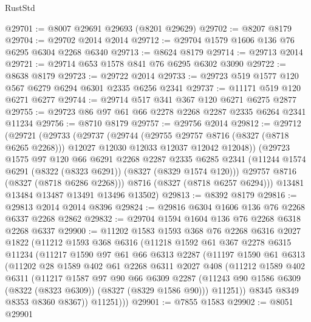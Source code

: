 \begin{lexlean}{RustStd}
\begin{coremodule}
@29701 := @8007 @29691 @29693 (@8201 @29629)
@29702 := @8207 @8179
@29704 := @29702 @2014 @2014
@29712 := @29704 @1579 @1606 @136 @76 @6295 @6304 @2268 @6340
@29713 := @8624 @8179
@29714 := @29713 @2014
@29721 := @29714 @653 @1578 @841 @76 @6295 @6302 @3090
@29722 := @8638 @8179
@29723 := @29722 @2014
@29733 := @29723 @519 @1577 @120 @567 @6279 @6294 @6301 @2335 @6256 @2341
@29737 := @11171 @519 @120 @6271 @6277
@29744 := @29714 @517 @341 @367 @120 @6271 @6275 @2877
@29755 := @29723 @86 @97 @61 @66 @2278 @2268 @2287 @2335 @6264 @2341 @11234
@29756 := @8710 @8179
@29757 := @29756 @2014
@29812 := @29712
    (@29721
      (@29733
        (@29737
          (@29744
            (@29755 @29757 @8716 (@8327 (@8718 @6265 @2268)))
            @12027
            @12030
            @12033
            @12037
            @12042
            @12048))
        (@29723
          @1575
          @97
          @120
          @66
          @6291
          @2268
          @2287
          @2335
          @6285
          @2341
          (@11244 @1574 @6291 (@8322 (@8323 @6291)) (@8327 (@8329 @1574 @120)))
          @29757
          @8716
          (@8327 (@8718 @6286 @2268)))
        @8716
        (@8327 (@8718 @6257 @6294)))
      @13481
      @13484
      @13487
      @13491
      @13496
      @13502)
@29813 := @8392 @8179
@29816 := @29813 @2014 @2014 @8396
@29824 := @29816 @6304 @1606 @136 @76 @2268 @6337 @2268 @2862
@29832 := @29704 @1594 @1604 @136 @76 @2268 @6318 @2268 @6337
@29900 := @11202
    @1583
    @1593
    @368
    @76
    @2268
    @6316
    @2027
    @1822
    (@11212
      @1593
      @368
      @6316
      (@11218
        @1592
        @61
        @367
        @2278
        @6315
        @11234
        (@11217
          @1590
          @97
          @61
          @66
          @6313
          @2287
          (@11197
            @1590
            @61
            @6313
            (@11202
              @28
              @1589
              @402
              @61
              @2268
              @6311
              @2027
              @408
              (@11212
                @1589
                @402
                @6311
                (@11217
                  @1587
                  @97
                  @90
                  @66
                  @6309
                  @2287
                  (@11243 @90 @1586 @6309 (@8322 (@8323 @6309)) (@8327 (@8329 @1586 @90)))
                  @11251))
              @8345
              @8349
              @8353
              @8360
              @8367))
          @11251)))
@29901 := @7855 @1583
@29902 := @8051 @29901

\end{coremodule}
\end{lexlean}
